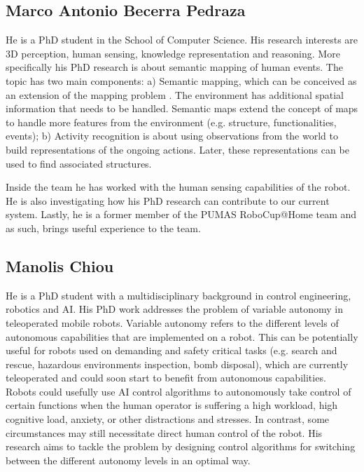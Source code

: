 \subsection{Marco Antonio Becerra Pedraza}

He is a PhD student in the School of Computer Science. His research interests are 3D perception, human sensing, knowledge representation and reasoning. More specifically his PhD research is about semantic mapping of human events. The topic has two main components: a) Semantic mapping, which can be conceived as an extension of the mapping problem \cite{Nuchter08_TowardsSemanticMaps}. The environment has additional spatial information that needs to be handled. Semantic maps extend the concept of maps to handle more features from the environment (e.g. structure, functionalities, events); b) Activity recognition is about using observations from the world to build representations of the ongoing actions. Later, these representations can be used to find associated structures.

Inside the team he has worked with the human sensing capabilities of the robot. He is also investigating how his PhD research can contribute to our current system. Lastly, he is a former member of the PUMAS RoboCup@Home team and as such, brings useful experience to the team.

\subsection{Manolis Chiou}

He is a PhD student with a multidisciplinary background in control engineering, robotics and AI. His PhD work addresses the problem of variable autonomy in teleoperated mobile robots. Variable autonomy refers to the different levels of autonomous capabilities that are implemented on a robot. This can be potentially useful for robots used on demanding and safety critical tasks (e.g. search and rescue, hazardous environments inspection, bomb disposal), which are currently teleoperated and could soon start to benefit from autonomous capabilities. Robots could usefully use AI control algorithms to autonomously take control of certain functions when the human operator is suffering a high workload, high cognitive load, anxiety, or other distractions and stresses. In contrast, some circumstances may still necessitate direct human control of the robot. His research aims to tackle the problem by designing control algorithms for switching between the different autonomy levels in an optimal way. 

